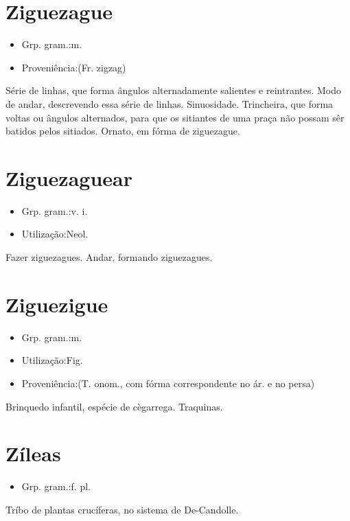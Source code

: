 \section{Ziguezague}
\begin{itemize}
\item {Grp. gram.:m.}
\end{itemize}
\begin{itemize}
\item {Proveniência:(Fr. \textunderscore zigzag\textunderscore )}
\end{itemize}
Série de linhas, que forma ângulos alternadamente salientes e reintrantes.
Modo de andar, descrevendo essa série de linhas.
Sinuosidade.
Trincheira, que forma voltas ou ângulos alternados, para que os sitiantes de uma praça não possam sêr batidos pelos sitiados.
Ornato, em fórma de ziguezague.
\section{Ziguezaguear}
\begin{itemize}
\item {Grp. gram.:v. i.}
\end{itemize}
\begin{itemize}
\item {Utilização:Neol.}
\end{itemize}
Fazer ziguezagues.
Andar, formando ziguezagues.
\section{Ziguezigue}
\begin{itemize}
\item {Grp. gram.:m.}
\end{itemize}
\begin{itemize}
\item {Utilização:Fig.}
\end{itemize}
\begin{itemize}
\item {Proveniência:(T. onom., com fórma correspondente no ár. e no persa)}
\end{itemize}
Brinquedo infantil, espécie de cègarrega.
Traquinas.
\section{Zíleas}
\begin{itemize}
\item {Grp. gram.:f. pl.}
\end{itemize}
Tríbo de plantas crucíferas, no sistema de De-Candolle.
